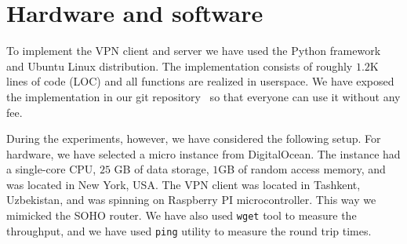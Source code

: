 \section{Hardware and software}
\label{sec:hardware}

To implement the VPN client and server we have used the Python 
framework and Ubuntu Linux distribution. The implementation consists 
of roughly $1.2$K lines of code (LOC) and all functions are realized 
in userspace. We have exposed the implementation in our git 
repository~\cite{impl} so that everyone can use it without any fee.

During the experiments, however, we have considered the following setup. 
For hardware, we have selected a micro instance from DigitalOcean. The 
instance had a single-core CPU, $25$ GB of data storage, $1$GB of random 
access memory, and was located in New York, USA. The VPN client was located 
in Tashkent, Uzbekistan, and was spinning on Raspberry PI microcontroller. 
This way we mimicked the SOHO router. We have also used \texttt{wget} tool to measure 
the throughput, and we have used \texttt{ping} utility to measure the round trip times. 

